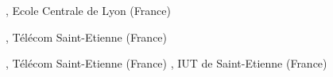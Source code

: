 \begin{rubric}{}
\entry*[2019 -- 2020]%
	\textbf{}, Ecole Centrale de Lyon (France)\par
\entry*[2017 -- 2020]%
	\textbf{}, Télécom Saint-Etienne (France)\par
\entry*[2015 -- 2017]%
	\textbf{}, Télécom Saint-Etienne (France)
\entry*[2015 -- 2017]%
	\textbf{}, IUT de Saint-Etienne (France)
\end{rubric}
